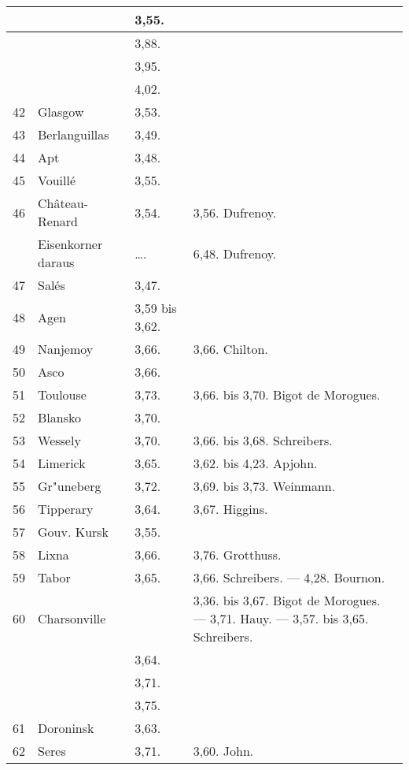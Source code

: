 \documentclass[a4paper, 11pt, oneside, polutonikogreek, german]{article}
\begin{document}
\begin{center}
\begin{longtable}{|p{7mm}|p{32mm}|p{30mm}|p{30mm}|}
          &   & 3,55. &   \\ \hline
          &   & 3,88. &   \\ \hline
          &   & 3,95. &   \\ \hline
          &   & 4,02. &   \\ \hline
        42 & Glasgow & 3,53. &   \\ \hline
        43 & Berlanguillas & 3,49. &   \\ \hline
        44 & Apt & 3,48. &   \\ \hline
        45 & Vouillé & 3,55. &   \\ \hline
        46 & Château-Renard & 3,54. & 3,56. Dufrenoy. \\ \hline
          & Eisenkorner daraus & …. & 6,48. Dufrenoy. \\ \hline
        47 & Salés & 3,47. &   \\ \hline
        48 & Agen & 3,59 bis 3,62. &   \\ \hline
        49 & Nanjemoy & 3,66. & 3,66. Chilton. \\ \hline
        50 & Asco & 3,66. &   \\ \hline
        51 & Toulouse & 3,73. & 3,66. bis 3,70. Bigot de Morogues. \\ \hline
        52 & Blansko & 3,70. &   \\ \hline
        53 & Wessely & 3,70. & 3,66. bis 3,68. Schreibers. \\ \hline
        54 & Limerick & 3,65. & 3,62. bis 4,23. Apjohn. \\ \hline
        55 & Gr"uneberg & 3,72. & 3,69. bis 3,73. Weinmann. \\ \hline
        56 & Tipperary & 3,64. & 3,67. Higgins. \\ \hline
        57 & Gouv. Kursk & 3,55. &   \\ \hline
        58 & Lixna & 3,66. & 3,76. Grotthuss. \\ \hline
        59 & Tabor & 3,65. & 3,66. Schreibers. --- 4,28. Bournon. \\ \hline
        60 & Charsonville &   & 3,36. bis 3,67. Bigot de Morogues. --- 3,71. Hauy. --- 3,57. bis 3,65. Schreibers. \\ \hline
          &   & 3,64. &   \\ \hline
          &   & 3,71. &   \\ \hline
          &   & 3,75. &   \\ \hline
        61 & Doroninsk & 3,63. &   \\ \hline
        62 & Seres & 3,71. & 3,60. John. \\ \hline

\end{longtable}
\end{center}
\end{document}
